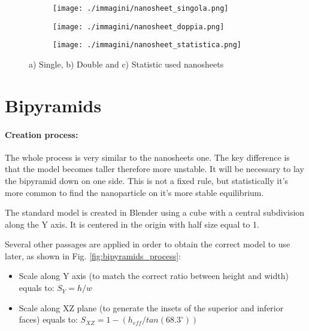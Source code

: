 \begin{figure}[ht]
    \centering
    \begin{subfigure}[b]{0.3\textwidth}
        \texttt{[image: ./immagini/nanosheet\_singola.png]}
        \caption{}
        \label{fig:nanosheet_a}
    \end{subfigure}
    \hfill
    \begin{subfigure}[b]{0.3\textwidth}
        \texttt{[image: ./immagini/nanosheet\_doppia.png]}
        \caption{}
        \label{fig:nanosheet_b}
    \end{subfigure}
    \hfill
    \begin{subfigure}[b]{0.3\textwidth}
        \texttt{[image: ./immagini/nanosheet\_statistica.png]}
        \caption{}
        \label{fig:nanosheet_c}
    \end{subfigure}
    \caption{a) Single, b) Double and  c) Statistic used nanosheets}
    \label{fig:nanosheet}
\end{figure}

\newpage

\section{Bipyramids}

\paragraph{Creation process: }

The whole process is very similar to the nanosheets one. The key difference is that the model becomes taller therefore more unstable. It will be necessary to lay the bipyramid down on one side. This is not a fixed rule, but statistically it's more common to find the nanoparticle on it's more stable equilibrium.

The standard model is created in Blender using a cube with a central subdivision along the Y axis. It is centered in the origin with half size equal to 1.

Several other passages are applied in order to obtain the correct model to use later, as shown in Fig. \ref{fig:bipyramids_process}:

\begin{itemize}
    \item Scale along Y axis (to match the correct ratio between height and width) equals to: $S_Y = h / w$
    \item Scale along XZ plane (to generate the insets of the superior and inferior faces) equals to: $S_{XZ} = 1 - (h_{eff} / tan(68.3^{\circ}))$
\end{itemize}

